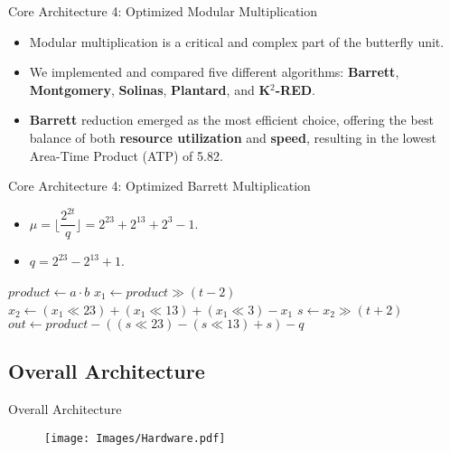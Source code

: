 \documentclass[
	10pt, t,
	hyperref={
		colorlinks,
		citecolor=CtpLatteTeal,
		linkcolor=CtpLatteTeal,
		urlcolor=CtpLatteBlue,
		pdfauthor={Bardia Taghavi},
		pdftitle={LightNTT: A Tiny NTT/iNTT Core for ML-DSA Featuring a Constant-Geometry Pipelined Design},
		pdfsubject={Cryptography},
		pdfkeywords={NTT, iNTT, ML-DSA, Constant-Geometry Pipelined Design},
		pdfcreator={Bardia Taghavi},
		pdfproducer={Bardia Taghavi}
		},
	aspectratio=1610,
	]
	{beamer}
\begin{document}
\begin{frame}{Core Architecture 4: Optimized Modular Multiplication}
	\begin{itemize}\setlength{\itemsep}{1.5em}
		\item Modular multiplication is a critical and complex part of the butterfly unit.
		\item We implemented and compared five different algorithms: \textbf{Barrett}, \textbf{Montgomery}, \textbf{Solinas}, \textbf{Plantard}, and \textbf{K$^2$-RED}.
		\item \textcolor<2->{CtpLatteBlue}{\textbf{Barrett}} reduction emerged as the most efficient choice, offering the best balance of both \textbf{resource utilization} and \textbf{speed}, resulting in the lowest Area-Time Product (ATP) of 5.82.
	\end{itemize}
\end{frame}
\begin{frame}{Core Architecture 4: Optimized Barrett Multiplication}
	\begin{itemize}\setlength{\itemsep}{1.5em}
		\item $\mu = \lfloor \dfrac{2^{2t}}{q} \rfloor = 2^{23} + 2^{13} + 2^{3} - 1$.
		\item $q = 2^{23} - 2^{13} + 1$.
	\end{itemize}
	\vspace{1ex}
	\begin{center}
		\begin{minipage}{0.81\textwidth}
			\begin{algorithm}[H]
				\DontPrintSemicolon
				$product \gets a \cdot b$\;
				$x_1 \gets product \gg (t-2)$\;
				$x_2 \gets (x_1 \ll 23) + (x_1 \ll 13) + (x_1 \ll 3) - x_1$ \;
				$s \gets x_2 \gg (t+2)$\;
				$out \gets product - ((s \ll 23) - (s \ll 13) + s) - q$\;
				\caption{Hardware-friendly Optimized Barrett Modular Multiplication}
				\label{alg:barrett}
			\end{algorithm}
		\end{minipage}
	\end{center}
\end{frame}
\subsection{Overall Architecture}
\begin{frame}{Overall Architecture}
	\begin{figure}
		\texttt{[image: Images/Hardware.pdf]}
	\end{figure}
\end{frame}
\end{document}
